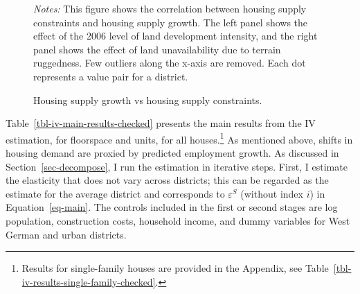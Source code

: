 \documentclass[
  12pt,
]{article}
\begin{document}
\begin{figure}
\begin{minipage}{0.50\linewidth}
{}


\end{minipage}%

\caption{\label{fig-scatter-supply-constraints}Housing supply growth vs
housing supply constraints.}
\begin{minipage}{0.975\textwidth}
\small
\emph{Notes:}
This figure shows the correlation between housing supply constraints and
housing supply growth. The left panel shows the effect of the 2006 level
of land development intensity, and the right panel shows the effect of
land unavailability due to terrain ruggedness. Few outliers along the
x-axis are removed. Each dot represents a value pair for a
district.
\end{minipage}


\end{figure}%

Table~\ref{tbl-iv-main-results-checked} presents the main results from
the IV estimation, for floorspace and units, for all houses.\footnote{Results
  for single-family houses are provided in the Appendix, see
  Table~\ref{tbl-iv-results-single-family-checked}.} As mentioned above,
shifts in housing demand are proxied by predicted employment growth. As
discussed in Section~\ref{sec-decompose}, I run the estimation in
iterative steps. First, I estimate the elasticity that does not vary
across districts; this can be regarded as the estimate for the average
district and corresponds to \(\varepsilon^S\) (without index \(i\)) in
Equation~\ref{eq-main}. The controls included in the first or second
stages are log population, construction costs, household income, and
dummy variables for West German and urban districts.
\end{document}
